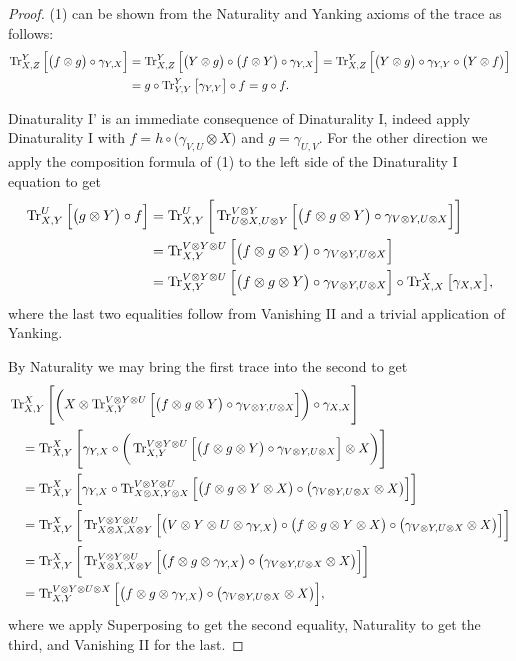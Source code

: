 \documentclass[12pt,oneside,article,draft]{memoir}
\begin{document}
\begin{proof}
 (1) can be shown from the Naturality and Yanking axioms of the trace as follows:
 \begin{align*}
  \operatorname{Tr}^Y_{X,Z}\Big[\big(f\otimes g\big)\circ\gamma_{Y,X}\Big]
  &=\operatorname{Tr}^Y_{X,Z}\Big[\big(Y\otimes g\big)\circ\big(f\otimes Y\big)\circ\gamma_{Y,X}\Big]=\operatorname{Tr}^Y_{X,Z}\Big[\big(Y\otimes g\big)\circ\gamma_{Y,Y}\circ\big(Y\otimes f\big)\Big]\\
  &=g\circ\operatorname{Tr}^Y_{Y,Y}\big[\gamma_{Y,Y}\big]\circ f=g\circ f.
 \end{align*}
 
 Dinaturality I' is an immediate consequence of Dinaturality I, indeed apply Dinaturality I with $f=h\circ\big(\gamma_{V,U}\otimes X\big)$ and $g=\gamma_{U,V}$.  For the other direction we apply the composition formula of (1) to the left side of the Dinaturality I equation to get
 \begin{align*}
  \operatorname{Tr}^U_{X,Y}\Big[\big(g\otimes Y\big)\circ f\Big]
  &=\operatorname{Tr}^U_{X,Y}\bigg[\operatorname{Tr}^{V\otimes Y}_{U\otimes X,U\otimes Y}\Big[\big(f\otimes g\otimes Y\big)\circ\gamma_{V\otimes Y,U\otimes X}\Big]\bigg]\\
 &=\operatorname{Tr}^{V\otimes Y\otimes U}_{X,Y}\Big[\big(f\otimes g\otimes Y\big)\circ\gamma_{V\otimes Y,U\otimes X}\Big]\\
  &=\operatorname{Tr}^{V\otimes Y\otimes U}_{X,Y}\Big[\big(f\otimes g\otimes Y\big)\circ\gamma_{V\otimes Y,U\otimes X}\Big]\circ\operatorname{Tr}^X_{X,X}\big[\gamma_{X,X}\big],
 \end{align*}
 where the last two equalities follow from Vanishing II and a trivial application of Yanking.  
 
 By Naturality we may bring the first trace into the second to get
 \begin{align*}
  &\operatorname{Tr}^X_{X,Y}\Bigg[\bigg(X\otimes \operatorname{Tr}^{V\otimes Y\otimes U}_{X,Y}\Big[\big(f\otimes g\otimes Y\big)\circ\gamma_{V\otimes Y,U\otimes X}\Big]\bigg)\circ\gamma_{X,X}\Bigg]\\
  &\quad=\operatorname{Tr}^X_{X,Y}\Bigg[\gamma_{Y,X}\circ\bigg(\operatorname{Tr}^{V\otimes Y\otimes U}_{X,Y}\Big[\big(f\otimes g\otimes Y\big)\circ\gamma_{V\otimes Y,U\otimes X}\Big]\otimes X\bigg)\Bigg]\\
  &\quad=\operatorname{Tr}^X_{X,Y}\bigg[\gamma_{Y,X}\circ\operatorname{Tr}^{V\otimes Y\otimes U}_{X\otimes X,Y\otimes X}\Big[\big(f\otimes g\otimes Y\otimes X\big)\circ\big(\gamma_{V\otimes Y,U\otimes X}\otimes X\big)\Big]\bigg]\\
  &\quad=\operatorname{Tr}^X_{X,Y}\bigg[\operatorname{Tr}^{V\otimes Y\otimes U}_{X\otimes X,X\otimes Y}\Big[\big(V\otimes Y\otimes U\otimes \gamma_{Y,X}\big)\circ\big(f\otimes g\otimes Y\otimes X\big)\circ\big(\gamma_{V\otimes Y,U\otimes X}\otimes X\big)\Big]\bigg]\\
  &\quad=\operatorname{Tr}^X_{X,Y}\bigg[\operatorname{Tr}^{V\otimes Y\otimes U}_{X\otimes X,X\otimes Y}\Big[\big(f\otimes g\otimes \gamma_{Y,X}\big)\circ\big(\gamma_{V\otimes Y,U\otimes X}\otimes X\big)\Big]\bigg]\\
  &\quad=\operatorname{Tr}^{V\otimes Y\otimes U\otimes X}_{X,Y}\Big[\big(f\otimes g\otimes \gamma_{Y,X}\big)\circ\big(\gamma_{V\otimes Y,U\otimes X}\otimes X\big)\Big],
 \end{align*}
 where we apply Superposing to get the second equality, Naturality to get the third, and Vanishing II for the last.
 

\end{proof}
\end{document}
